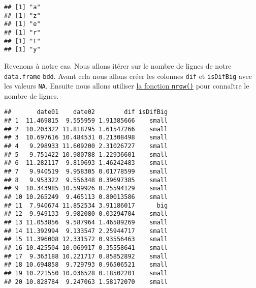 \documentclass[]{book}
\newenvironment{Shaded}{\begin{snugshade}}{\end{snugshade}}
\newcommand{\KeywordTok}[1]{\textcolor[rgb]{0.13,0.29,0.53}{\textbf{#1}}}
\newcommand{\DataTypeTok}[1]{\textcolor[rgb]{0.13,0.29,0.53}{#1}}
\newcommand{\DecValTok}[1]{\textcolor[rgb]{0.00,0.00,0.81}{#1}}
\newcommand{\StringTok}[1]{\textcolor[rgb]{0.31,0.60,0.02}{#1}}
\newcommand{\OtherTok}[1]{\textcolor[rgb]{0.56,0.35,0.01}{#1}}
\newcommand{\ControlFlowTok}[1]{\textcolor[rgb]{0.13,0.29,0.53}{\textbf{#1}}}
\newcommand{\OperatorTok}[1]{\textcolor[rgb]{0.81,0.36,0.00}{\textbf{#1}}}
\newcommand{\NormalTok}[1]{#1}
\theoremstyle{definition}
\theoremstyle{definition}
\theoremstyle{definition}
\theoremstyle{remark}
\begin{document}
\begin{verbatim}
## [1] "a"
## [1] "z"
## [1] "e"
## [1] "r"
## [1] "t"
## [1] "y"
\end{verbatim}

Revenons à notre cas. Nous allons itérer sur le nombre de lignes de
notre \texttt{data.frame} \texttt{bdd}. Avant cela nous allons créer les
colonnes \texttt{dif} et \texttt{isDifBig} avec les valeurs \texttt{NA}.
Ensuite nous allons utiliser \protect\hyperlink{l015nrow}{la fonction
\texttt{nrow()}} pour connaître le nombre de lignes.

\begin{Shaded}
\end{Shaded}

\begin{verbatim}
##       date01    date02        dif isDifBig
## 1  11.469815  9.555959 1.91385666    small
## 2  10.203322 11.818795 1.61547266    small
## 3  10.697616 10.484531 0.21308498    small
## 4   9.298933 11.609200 2.31026727    small
## 5   9.751422 10.980788 1.22936601    small
## 6  11.282117  9.819693 1.46242483    small
## 7   9.940519  9.958305 0.01778599    small
## 8   9.953322  9.556348 0.39697385    small
## 9  10.343985 10.599926 0.25594129    small
## 10 10.265249  9.465113 0.80013586    small
## 11  7.940674 11.852534 3.91186017      big
## 12  9.949133  9.982080 0.03294704    small
## 13 11.053856  9.587964 1.46589269    small
## 14 11.392994  9.133547 2.25944717    small
## 15 11.396008 12.331572 0.93556463    small
## 16 10.425504 10.069917 0.35558641    small
## 17  9.363188 10.221717 0.85852892    small
## 18 10.694858  9.729793 0.96506521    small
## 19 10.221550 10.036528 0.18502201    small
## 20 10.828784  9.247063 1.58172070    small
\end{verbatim}
\end{document}
